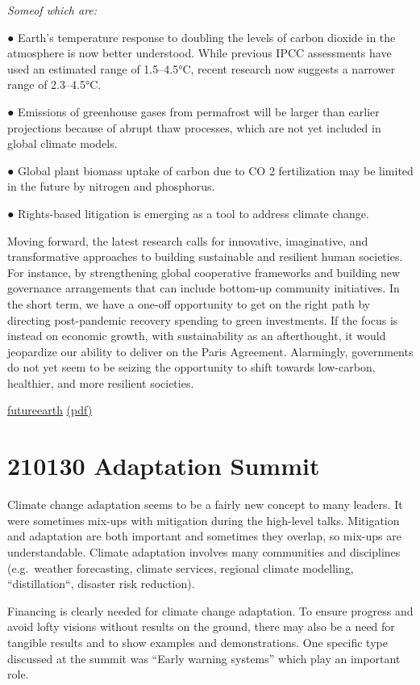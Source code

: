 \documentclass[
]{book}
\begin{document}
\emph{Someof which are:}

● Earth's temperature response to doubling the levels of carbon dioxide in the
atmosphere is now better understood. While previous IPCC assessments have used
an estimated range of 1.5--4.5°C, recent research now suggests a narrower range of
2.3--4.5°C.

● Emissions of greenhouse gases from permafrost will be larger than earlier
projections because of abrupt thaw processes, which are not yet included in global
climate models.

● Global plant biomass uptake of carbon due to CO 2 fertilization may be limited in
the future by nitrogen and phosphorus.

● Rights-based litigation is emerging as a tool to address climate change.

Moving forward, the latest research calls for innovative, imaginative, and transformative
approaches to building sustainable and resilient human societies. For instance, by strengthening
global cooperative frameworks and building new governance arrangements that can include
bottom-up community initiatives. In the short term, we have a one-off opportunity to get on
the right path by directing post-pandemic recovery spending to green investments. If the focus
is instead on economic growth, with sustainability as an afterthought, it would jeopardize our
ability to deliver on the Paris Agreement. Alarmingly, governments do not yet seem to be seizing
the opportunity to shift towards low-carbon, healthier, and more resilient societies.

\href{https://10nics2020.futureearth.org/}{futureearth}
\href{pdf/10-new-insights-in-climate-science-2020.pdf}{(pdf)}

\hypertarget{adaptation-summit}{%
\section{210130 Adaptation Summit}\label{adaptation-summit}}

Climate change adaptation seems to be a fairly new concept to many leaders. It were sometimes mix-ups with mitigation during the high-level talks.
Mitigation and adaptation are both important and sometimes they overlap, so mix-ups are understandable.
Climate adaptation involves many communities and disciplines (e.g.~weather forecasting, climate services, regional climate modelling, ``distillation``, disaster risk reduction).

Financing is clearly needed for climate change adaptation. To ensure progress and avoid lofty visions without results on the ground, there may also be a need for tangible results and to show examples and demonstrations. One specific type discussed at the summit was ``Early warning systems'' which play an important role.
\end{document}
